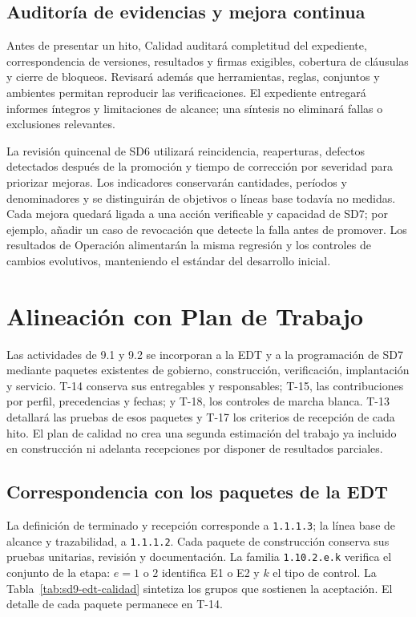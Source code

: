 \subsection{Auditoría de evidencias y mejora continua}
Antes de presentar un hito, Calidad auditará completitud del expediente, correspondencia de versiones, resultados y firmas exigibles, cobertura de cláusulas y cierre de bloqueos. Revisará además que herramientas, reglas, conjuntos y ambientes permitan reproducir las verificaciones. El expediente entregará informes íntegros y limitaciones de alcance; una síntesis no eliminará fallas o exclusiones relevantes.

La revisión quincenal de SD6 utilizará reincidencia, reaperturas, defectos detectados después de la promoción y tiempo de corrección por severidad para priorizar mejoras. Los indicadores conservarán cantidades, períodos y denominadores y se distinguirán de objetivos o líneas base todavía no medidas. Cada mejora quedará ligada a una acción verificable y capacidad de SD7; por ejemplo, añadir un caso de revocación que detecte la falla antes de promover. Los resultados de Operación alimentarán la misma regresión y los controles de cambios evolutivos, manteniendo el estándar del desarrollo inicial. \parencite[RT-21.20, p.~38]{sd9-bt}

\section{Alineación con Plan de Trabajo}
Las actividades de 9.1 y 9.2 se incorporan a la EDT y a la programación de SD7 mediante paquetes existentes de gobierno, construcción, verificación, implantación y servicio. T-14 conserva sus entregables y responsables; T-15, las contribuciones por perfil, precedencias y fechas; y T-18, los controles de marcha blanca. T-13 detallará las pruebas de esos paquetes y T-17 los criterios de recepción de cada hito. El plan de calidad no crea una segunda estimación del trabajo ya incluido en construcción ni adelanta recepciones por disponer de resultados parciales. \parencites[sec.~7.1--7.3]{sd9-sd7}[Diccionario de gobierno, pruebas, formación y servicio]{sd9-t14}

\subsection{Correspondencia con los paquetes de la EDT}
La definición de terminado y recepción corresponde a \texttt{1.1.1.3}; la línea base de alcance y trazabilidad, a \texttt{1.1.1.2}. Cada paquete de construcción conserva sus pruebas unitarias, revisión y documentación. La familia \texttt{1.10.2.e.k} verifica el conjunto de la etapa: $e=1$ o $2$ identifica E1 o E2 y $k$ el tipo de control. La Tabla~\ref{tab:sd9-edt-calidad} sintetiza los grupos que sostienen la aceptación. El detalle de cada paquete permanece en T-14. \parencite[Diccionario de gobierno, pruebas, formación y servicio]{sd9-t14}

